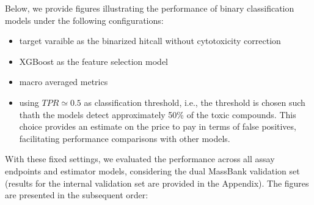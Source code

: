 Below, we provide figures illustrating the performance of binary classification models under the following configurations:
\begin{itemize}
  \item target varaible as the binarized hitcall without cytotoxicity correction
  \item XGBoost as the feature selection model
  \item macro averaged metrics
  \item using $TPR \simeq 0.5 $ as classification threshold, i.e., the threshold is chosen such thath the models detect approximately 50\% of the toxic compounds. This choice provides an estimate on the price to pay in terms of false positives, facilitating performance comparisons with other models.
\end{itemize}

With these fixed settings, we evaluated the performance across all assay endpoints and estimator models, considering the dual MassBank validation set (results for the internal validation set are provided in the Appendix). The figures are presented in the subsequent order:

